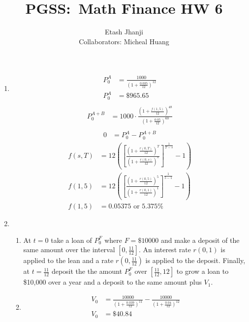 \documentclass[11pt,letterpaper]{article}
\author{Etash Jhanji\\\small Collaborators: Micheal Huang}
\title{PGSS:\ Math Finance HW 6}
\date{}
\begin{document}
\maketitle
\begin{enumerate}
    \item\begin{align*}
            P_0^A &= \frac{1000}{\left(1+\frac{0.035}{12}\right)^{12}}\\
            P_0^A &= \$ 965.65\\
        \end{align*}
        \begin{align*}
            P_0^{A\!+\!B} &= 1000\cdot\frac{\left(1+\frac{f(1,5)}{12}\right)^{48}}{\left(1+\frac{0.05}{12}\right)^{60}}\\
        \end{align*}
        \begin{align*}
            0 &= P_0^A - P_0^{A\!+\!B}
        \end{align*}
        \begin{align*}
            f(s,T) &= 12{\left( \left[ \frac{(1+ \frac{r(0,T)}{12})^T}{(1+ \frac{r(0,s)}{12})^s} \right]^{\frac{1}{T-s}}-1 \right)}\\
            f(1,5) &= 12{\left( \left[ \frac{(1+ \frac{r(0,5)}{12})^5}{(1+ \frac{r(0,1)}{12})^1} \right]^{\frac{1}{5-1}}-1 \right)}\\
            f(1,5) &= 0.05375 \text{ or } 5.375\%
        \end{align*}
    \item \begin{enumerate}
        \item At $t=0$ take a loan of $P_0^F$ where $F = \$10000$ and make a deposit of the same amount over the interval $\left[0,\frac{11}{12}\right]$. An interest rate $r(0,1)$ is applied to the lean and a rate $r(0,\frac{11}{12})$ is applied to the deposit. Finally, at $t=\frac{11}{12}$ deposit the the amount $P_0^F$ over $\left[\frac{11}{12}, 12\right]$ to grow a loan to \$10,000 over a year and a deposit to the same amount plus $V_1$. 
        \item \begin{align*}
            V_0 &= \frac{10000}{\left(1+\frac{0.039}{12}\right)^{11}} - \frac{10000}{\left(1+\frac{0.04}{12}\right)^{12}}\\
            V_0 &= \$ 40.84\\
        \end{align*}
    \end{enumerate}
\end{enumerate}
\end{document}

